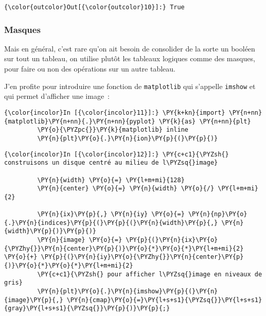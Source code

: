 \begin{Verbatim}[commandchars=\\\{\},frame=single,framerule=0.3mm,rulecolor=\color{cellframecolor}]
{\color{outcolor}Out[{\color{outcolor}10}]:} True
\end{Verbatim}
            
    \hypertarget{masques}{%
\subsubsection{Masques}\label{masques}}

    Mais en général, c'est rare qu'on ait besoin de consolider de la sorte
un booléen sur tout un tableau, on utilise plutôt les tableaux logiques
comme des masques, pour faire ou non des opérations sur un autre
tableau.

    J'en profite pour introduire une fonction de \texttt{matplotlib} qui
s'appelle \texttt{imshow} et qui permet d'afficher une image~:

    \begin{Verbatim}[commandchars=\\\{\},frame=single,framerule=0.3mm,rulecolor=\color{cellframecolor}]
{\color{incolor}In [{\color{incolor}11}]:} \PY{k+kn}{import} \PY{n+nn}{matplotlib}\PY{n+nn}{.}\PY{n+nn}{pyplot} \PY{k}{as} \PY{n+nn}{plt}
         \PY{o}{\PYZpc{}}\PY{k}{matplotlib} inline
         \PY{n}{plt}\PY{o}{.}\PY{n}{ion}\PY{p}{(}\PY{p}{)}
\end{Verbatim}


    \begin{Verbatim}[commandchars=\\\{\},frame=single,framerule=0.3mm,rulecolor=\color{cellframecolor}]
{\color{incolor}In [{\color{incolor}12}]:} \PY{c+c1}{\PYZsh{} construisons un disque centré au milieu de l\PYZsq{}image}
         
         \PY{n}{width} \PY{o}{=} \PY{l+m+mi}{128}
         \PY{n}{center} \PY{o}{=} \PY{n}{width} \PY{o}{/} \PY{l+m+mi}{2}
         
         \PY{n}{ix}\PY{p}{,} \PY{n}{iy} \PY{o}{=} \PY{n}{np}\PY{o}{.}\PY{n}{indices}\PY{p}{(}\PY{p}{(}\PY{n}{width}\PY{p}{,} \PY{n}{width}\PY{p}{)}\PY{p}{)}
         \PY{n}{image} \PY{o}{=} \PY{p}{(}\PY{n}{ix}\PY{o}{\PYZhy{}}\PY{n}{center}\PY{p}{)}\PY{o}{*}\PY{o}{*}\PY{l+m+mi}{2} \PY{o}{+} \PY{p}{(}\PY{n}{iy}\PY{o}{\PYZhy{}}\PY{n}{center}\PY{p}{)}\PY{o}{*}\PY{o}{*}\PY{l+m+mi}{2}
         \PY{c+c1}{\PYZsh{} pour afficher l\PYZsq{}image en niveaux de gris}
         \PY{n}{plt}\PY{o}{.}\PY{n}{imshow}\PY{p}{(}\PY{n}{image}\PY{p}{,} \PY{n}{cmap}\PY{o}{=}\PY{l+s+s1}{\PYZsq{}}\PY{l+s+s1}{gray}\PY{l+s+s1}{\PYZsq{}}\PY{p}{)}\PY{p}{;}
\end{Verbatim}



